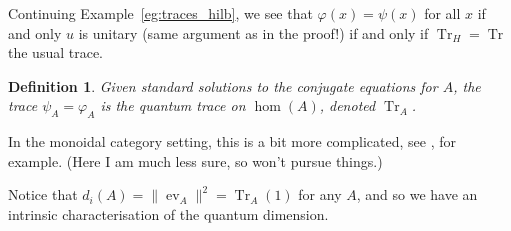\documentclass[a4paper,11pt]{article}
\theoremstyle{plain}
\newtheorem{definition}[proposition]{Definition}
\theoremstyle{remark}
\newenvironment{example}
  {\pushQED{\qed}\renewcommand{\qedsymbol}{$\triangle$}\examplex}
  {\popQED\endexamplex}
\newcommand{\ev}{\operatorname{ev}}
\newcommand{\tr}{\operatorname{Tr}}
\begin{document}
\begin{example}
Continuing Example~\ref{eg:traces_hilb}, we see that $\varphi(x) = \psi(x)$ for all $x$ if and only $u$ is unitary (same argument as in the proof!) if and only if $\tr_H = \tr$ the usual trace.
\end{example}

\begin{definition}\label{defn:quantum_trace}
Given standard solutions to the conjugate equations for $A$, the trace $\psi_A = \varphi_A$ is the \emph{quantum trace} on $\hom(A)$, denoted $\tr_A$.
\end{definition}

In the monoidal category setting, this is a bit more complicated, see \cite[Section~4.7]{EGNO_TensorCategories}, for example.  (Here I am much less sure, so won't pursue things.)

Notice that $d_i(A) = \|\ev_A\|^2 = \tr_A(1)$ for any $A$, and so we have an intrinsic characterisation of the quantum dimension.
\end{document}
